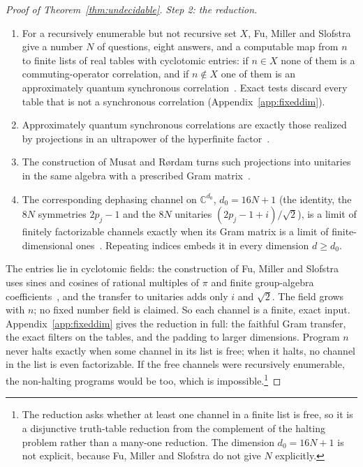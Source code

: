 \documentclass[11pt]{article}
\theoremstyle{definition}
\theoremstyle{remark}
\begin{document}
\begin{proof}[Proof of Theorem~\ref{thm:undecidable}]
\emph{Step 2: the reduction.}
\begin{enumerate}[label=(\alph*), leftmargin=*]
\item For a recursively enumerable but not recursive set $X$, Fu, Miller and Slofstra give a number $N$ of questions, eight answers, and a computable map from $n$ to finite lists of real tables with cyclotomic entries: if $n\in X$ none of them is a commuting-operator correlation, and if $n\notin X$ one of them is an approximately quantum synchronous correlation~\cite[Thm.~7.2]{FMS}. Exact tests discard every table that is not a synchronous correlation (Appendix~\ref{app:fixeddim}).
\item Approximately quantum synchronous correlations are exactly those realized by projections in an ultrapower of the hyperfinite factor~\cite{KPS18}.
\item The construction of Musat and R{\o}rdam turns such projections into unitaries in the same algebra with a prescribed Gram matrix~\cite{MusatRordam}.
\item The corresponding dephasing channel on $\mathbb C^{d_0}$, $d_0=16N+1$ (the identity, the $8N$ symmetries $2p_j-1$ and the $8N$ unitaries $(2p_j-1+i)/\sqrt2$), is a limit of finitely factorizable channels exactly when its Gram matrix is a limit of finite-dimensional ones~\cite{Musat25}. Repeating indices embeds it in every dimension $d\ge d_0$.
\end{enumerate}
The entries lie in cyclotomic fields: the construction of Fu, Miller and Slofstra uses sines and cosines of rational multiples of $\pi$ and finite group-algebra coefficients~\cite[Sec.~7, Thm.~7.2]{FMS}, and the transfer to unitaries adds only $i$ and $\sqrt2$. The field grows with $n$; no fixed number field is claimed. So each channel is a finite, exact input. Appendix~\ref{app:fixeddim} gives the reduction in full: the faithful Gram transfer, the exact filters on the tables, and the padding to larger dimensions. Program $n$ never halts exactly when some channel in its list is free; when it halts, no channel in the list is even factorizable. If the free channels were recursively enumerable, the non-halting programs would be too, which is impossible.\footnote{The reduction asks whether at least one channel in a finite list is free, so it is a disjunctive truth-table reduction from the complement of the halting problem rather than a many-one reduction. The dimension $d_0=16N+1$ is not explicit, because Fu, Miller and Slofstra do not give $N$ explicitly.}
\end{proof}
\end{document}

